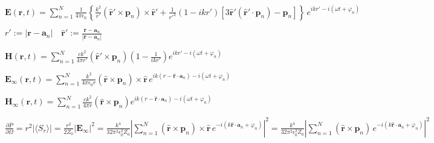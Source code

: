 \documentclass[multi={mymath},border=1pt,convert={density=300,outext=.png}]{standalone}
\newenvironment{mymath}{$\displaystyle}{$}
\begin{document}
\pagecolor[RGB]{255,255,255} %

\newcommand{\norm}[1]{\left|#1\right|}

\begin{mymath}
\mathbf{E}(\mathbf{r}, t) = \sum_{n=1}^{N}\frac{1}{4\pi\epsilon_{0}}\left\{ \frac{k^{2}}{r'}(\mathbf{\hat{r}'} \times \mathbf{p}_{n}) \times \mathbf{\hat{r}'} + \frac{1}{r'^{3}}(1-ikr')\left[3\mathbf{\hat{r}'}(\mathbf{\hat{r}'}\cdot\mathbf{p}_{n}) - \mathbf{p}_{n}\right]\right\}\,e^{ikr' - i(\omega t + \varphi_{n})}
\end{mymath}

\begin{mymath}
r' := |\mathbf{r} - \mathbf{a}_{n}|\quad\mathbf{\hat{r}'} := \frac{\mathbf{r} - \mathbf{a}_{n}}{|\mathbf{r} - \mathbf{a}_{n}|}
\end{mymath}

\begin{mymath}
\mathbf{H}(\mathbf{r}, t) = \sum_{n=1}^{N}\frac{ck^2}{4\pi r'} (\mathbf{\hat{r}'} \times \mathbf{p}_{n}) \left (1 - \frac{1}{ikr'}\right) e^{ikr' - i(\omega t + \varphi_{n})}
\end{mymath}


\begin{mymath}
\mathbf{E}_{\infty}(\mathbf{r}, t) = \sum_{n=1}^{N}\frac{k^{2}}{4\pi\epsilon_{0}r} (\mathbf{\hat{r}} \times \mathbf{p}_{n}) \times \mathbf{\hat{r}}\,e^{ik(r - \mathbf{\hat{r}}\cdot\mathbf{a}_{n}) - i(\omega t + \varphi_{n})}
\end{mymath}

\begin{mymath}
\mathbf{H}_\infty(\mathbf{r}, t) = \sum_{n=1}^{N}\frac{ck^2}{4\pi r} (\mathbf{\hat{r}} \times \mathbf{p}_{n}) e^{ik(r - \mathbf{\hat{r}}\cdot\mathbf{a}_n) - i(\omega t + \varphi_{n})}
\end{mymath}


\begin{mymath}
  \frac{\partial \overline{P}}{\partial \Omega} = r^{2} |\langle S_{r} \rangle| = \frac{r^{2}}{2Z_0} \norm{\mathbf{E}_{\infty}}^{2} = \frac{k^{4}}{32\pi^{2}\epsilon_{0}^{2}Z_0} \norm{\sum_{n=1}^{N} (\mathbf{\hat{r}} \times \mathbf{p}_{n}) \times \mathbf{\hat{r}}\, e^{- i(k\mathbf{\hat{r}}\cdot\mathbf{a}_{n} + \varphi_{n})}}^{2} = \frac{k^{4}}{32\pi^{2}\epsilon_{0}^{2}Z_0} \norm{\sum_{n=1}^{N} (\mathbf{\hat{r}} \times \mathbf{p}_{n})\, e^{- i(k\mathbf{\hat{r}}\cdot\mathbf{a}_{n} + \varphi_{n})}}^{2}
\end{mymath}
\end{document}
